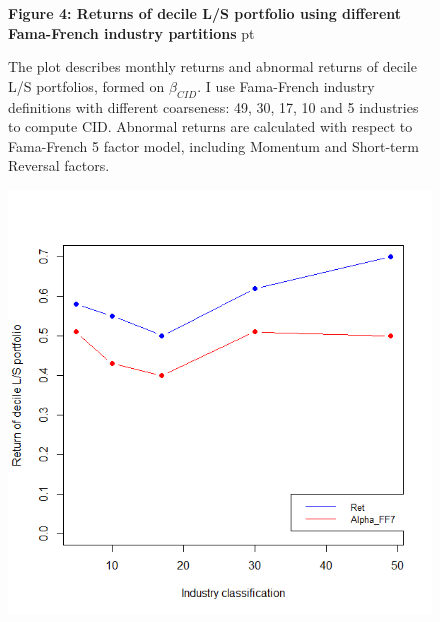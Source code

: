 \documentclass[12pt]{article}
\begin{document}
\begin{figure}
\textbf{Figure 4: Returns of decile L/S portfolio using different Fama-French industry partitions}
 pt
\begin{flushleft}
{The plot describes monthly returns and abnormal returns of decile L/S portfolios, formed on $\beta_{CID}$. I use Fama-French industry definitions with different coarseness: 49, 30, 17, 10 and 5 industries to compute CID. Abnormal returns are calculated with respect to Fama-French 5 factor model, including Momentum and Short-term Reversal factors.}
\end{flushleft}
\centering
\includegraphics[width=1\textwidth]{alphas_inds.png}
\end{figure}


\clearpage
\end{document}
